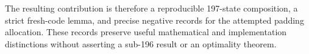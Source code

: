 The resulting contribution is therefore a reproducible 197-state
composition, a strict fresh-code lemma, and precise negative records for
the attempted padding allocation.  These records preserve useful
mathematical and implementation distinctions without asserting a
sub-196 result or an optimality theorem.
